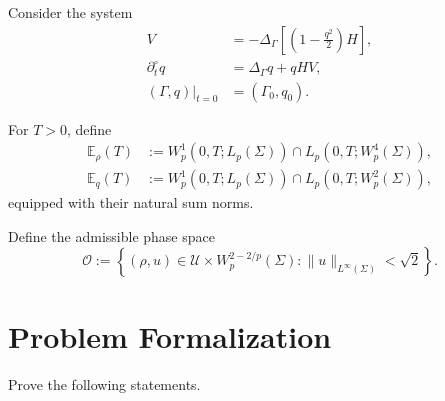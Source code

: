 \documentclass[10pt,a4paper]{article}
\theoremstyle{definition}
\newcommand{\Erho}{\mathbb E_{\rho}}
\newcommand{\Eq}{\mathbb E_{q}}
\begin{document}
Consider the system
\begin{equation}
  \boxed{
  \begin{aligned}
    V
    &=
    -\Delta_\Gamma
    \left[\left(1-\frac{q^2}{2}\right)H\right],\\[0.4em]
    \partial_t^\circ q
    &=
    \Delta_\Gamma q+qHV,\\[0.4em]
    (\Gamma,q)\big|_{t=0}
    &=
    (\Gamma_0,q_0).
  \end{aligned}}
  \label{eq:system}
\end{equation}

For $T>0$, define
\begin{align}
  \Erho(T)
  &:={W_p^1(0,T;L_p(\Sigma))}
    \cap L_p(0,T;W_p^4(\Sigma)),\\
  \Eq(T)
  &:={W_p^1(0,T;L_p(\Sigma))}
    \cap L_p(0,T;W_p^2(\Sigma)),
\end{align}
equipped with their natural sum norms.

Define the admissible phase space
\begin{equation}
  \mathcal O
  :=
  \left\{
    (\rho,u)\in
    \mathcal U\times W_p^{2-2/p}(\Sigma):
    \lVert u\rVert_{L^\infty(\Sigma)}<\sqrt2
  \right\}.
\end{equation}

\section{Problem Formalization}

Prove the following statements.
\end{document}
